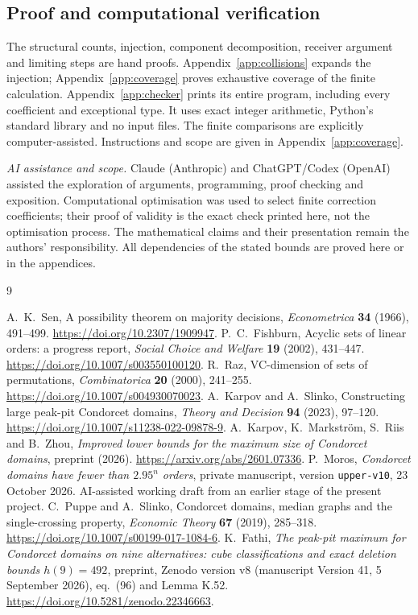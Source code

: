 \documentclass[11pt,letterpaper]{article}
\theoremstyle{definition}
\begin{document}
\subsection*{Proof and computational verification}
The structural counts, injection, component decomposition, receiver
argument and limiting steps are hand proofs. Appendix~\ref{app:collisions}
expands the injection; Appendix~\ref{app:coverage} proves exhaustive
coverage of the finite calculation. Appendix~\ref{app:checker} prints
its entire program, including every coefficient and exceptional type.
It uses exact integer arithmetic, Python's standard library and no
input files. The finite comparisons are explicitly computer-assisted.
Instructions and scope are given in Appendix~\ref{app:coverage}.

\smallskip
\textit{AI assistance and scope.} Claude (Anthropic) and ChatGPT/Codex
(OpenAI) assisted the exploration of arguments, programming, proof
checking and exposition. Computational optimisation was used to select
finite correction coefficients; their proof of validity is the exact
check printed here, not the optimisation process. The mathematical
claims and their presentation remain the authors' responsibility.
All dependencies of the stated bounds are proved here or in the appendices.

\clearpage
\begin{thebibliography}{9}
\small\raggedright
\setlength{\itemsep}{4pt}
 A.~K.~Sen, A possibility theorem on majority decisions,
\emph{Econometrica} \textbf{34} (1966), 491--499.
\url{https://doi.org/10.2307/1909947}.
 P.~C.~Fishburn, Acyclic sets of linear orders:
a progress report, \emph{Social Choice and Welfare} \textbf{19}
(2002), 431--447. \url{https://doi.org/10.1007/s003550100120}.
 R.~Raz, VC-dimension of sets of permutations,
\emph{Combinatorica} \textbf{20} (2000), 241--255.
\url{https://doi.org/10.1007/s004930070023}.
 A.~Karpov and A.~Slinko, Constructing large
peak-pit Condorcet domains, \emph{Theory and Decision} \textbf{94}
(2023), 97--120. \url{https://doi.org/10.1007/s11238-022-09878-9}.
 A.~Karpov, K.~Markstr\"om, S.~Riis and B.~Zhou,
\emph{Improved lower bounds for the maximum size of Condorcet domains},
preprint (2026). \url{https://arxiv.org/abs/2601.07336}.
 P.~Moros, \emph{Condorcet domains have fewer than
\(2.95^n\) orders}, private manuscript, version \texttt{upper-v10},
23 October 2026. AI-assisted working draft from an earlier stage of
the present project.
 C.~Puppe and A.~Slinko, Condorcet domains,
median graphs and the single-crossing property,
\emph{Economic Theory} \textbf{67} (2019), 285--318.
\url{https://doi.org/10.1007/s00199-017-1084-6}.
 K.~Fathi, \emph{The peak-pit maximum for Condorcet
domains on nine alternatives: cube classifications and exact deletion
bounds \(h(9)=492\)}, preprint, Zenodo version v8
(manuscript Version 41, 5 September 2026), eq.\ (96) and Lemma K.52.
\url{https://doi.org/10.5281/zenodo.22346663}.
\end{thebibliography}
\end{document}
